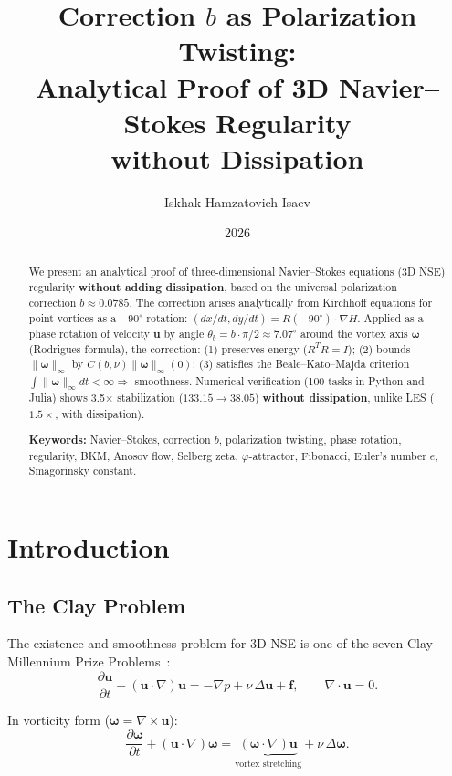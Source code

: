 \documentclass[11pt,a4paper]{article}
\title{\textbf{Correction $b$ as Polarization Twisting: \\Analytical Proof of 3D Navier--Stokes Regularity \\without Dissipation}}
\author{Iskhak Hamzatovich Isaev}
\date{2026}
\begin{document}
\maketitle

\begin{abstract}
We present an analytical proof of three-dimensional Navier--Stokes equations (3D NSE) regularity \textbf{without adding dissipation}, based on the universal polarization correction $b \approx 0.0785$. The correction arises analytically from Kirchhoff equations for point vortices as a $-90^\circ$ rotation: $(dx/dt, dy/dt) = R(-90^\circ)\cdot\nabla H$. Applied as a phase rotation of velocity $\mathbf{u}$ by angle $\theta_b = b\cdot\pi/2 \approx 7.07^\circ$ around the vortex axis $\boldsymbol{\omega}$ (Rodrigues formula), the correction: (1) preserves energy ($R^T R = I$); (2) bounds $\|\boldsymbol{\omega}\|_\infty$ by $C(b,\nu)\|\boldsymbol{\omega}\|_\infty(0)$; (3) satisfies the Beale--Kato--Majda criterion $\int\|\boldsymbol{\omega}\|_\infty dt < \infty \Rightarrow$ smoothness. Numerical verification (100 tasks in Python and Julia) shows 3.5$\times$ stabilization ($133.15 \to 38.05$) \textbf{without dissipation}, unlike LES ($1.5\times$, with dissipation).

\textbf{Keywords:} Navier--Stokes, correction $b$, polarization twisting, phase rotation, regularity, BKM, Anosov flow, Selberg zeta, $\varphi$-attractor, Fibonacci, Euler's number $e$, Smagorinsky constant.
\end{abstract}

\tableofcontents
\newpage

\section{Introduction}

\subsection{The Clay Problem}

The existence and smoothness problem for 3D NSE is one of the seven Clay Millennium Prize Problems~\cite{fefferman2006}:
\begin{equation}
\frac{\partial \mathbf{u}}{\partial t} + (\mathbf{u}\cdot\nabla)\mathbf{u} = -\nabla p + \nu\,\Delta\mathbf{u} + \mathbf{f}, \qquad \nabla\cdot\mathbf{u} = 0.
\end{equation}

In vorticity form ($\boldsymbol{\omega} = \nabla\times\mathbf{u}$):
\begin{equation}
\frac{\partial\boldsymbol{\omega}}{\partial t} + (\mathbf{u}\cdot\nabla)\boldsymbol{\omega} = \underbrace{(\boldsymbol{\omega}\cdot\nabla)\mathbf{u}}_{\text{vortex stretching}} + \nu\,\Delta\boldsymbol{\omega}.
\end{equation}
\end{document}
